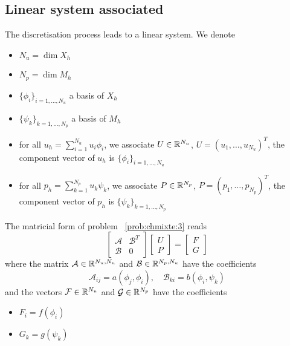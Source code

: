 \subsection{Linear system associated}
\label{sec:linear-system}

The discretisation process leads to a linear system. We denote
  \begin{itemize}
  \item $N_u = \dim {X_h}$
  \item $N_p = \dim {M_h}$
  \item $\{\phi_i\}_{i=1,...,N_u}$ a basis of $X_h$
  \item $\{\psi_k\}_{k=1,...,N_p}$ a basis of $M_h$
  \item for all $u_h = \sum_{i=1}^{N_u} u_i \phi_i$, we associate $U \in
    \mathbb R^{N_u}$, $U=(u_1,\ldots,u_{N_u})^T$, the component vector of $u_h$ is
    $\{\phi_i\}_{i=1,\ldots,N_u}$
  \item for all $p_h = \sum_{k=1}^{N_p} u_k \psi_k$, we associate $P \in
    \mathbb R^{N_p}$, $P=(p_1,\ldots,p_{N_p})^T$, the component vector of $p_h$ is $\{\psi_k\}_{k=1,\ldots,N_p}$
  \end{itemize}

  \begin{block}{}
    The matricial form of problem ~\ref{prob:chmixte:3} reads
    \begin{equation}
      \label{eq:chmixte:15}
      \begin{bmatrix}
        \mathcal{A} & \mathcal{B}^T\\
        \mathcal{B} & 0
      \end{bmatrix}
      \begin{bmatrix}
        U \\
        P
      \end{bmatrix}
      =
      \begin{bmatrix}
        F\\
        G
      \end{bmatrix}
    \end{equation}
    where the matrix $\mathcal{A} \in \mathbb R^{N_u,N_u}$ and $\mathcal{B} \in
    \mathbb R^{N_p,N_u}$ have the coefficients
    \begin{equation}
      \label{eq:chmixte:16}
      \mathcal{A}_{ij} = a(\phi_j,\phi_i), \quad \mathcal{B}_{ki} = b(\phi_i,\psi_k)
    \end{equation}
    and the vectors $\mathcal{F} \in \mathbb R^{N_u}$ and $\mathcal{G} \in \mathbb R^{N_p}$
    have the coefficients
    \begin{itemize}
    \item $F_i=f(\phi_i)$
    \item $G_k=g(\psi_k)$
    \end{itemize}
  \end{block}


